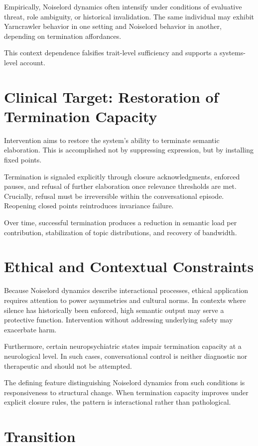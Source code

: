 \documentclass[12pt]{article}
\theoremstyle{remark}
\begin{document}
Empirically, Noiselord dynamics often intensify under conditions of evaluative threat, role ambiguity, or historical invalidation. The same individual may exhibit Yarncrawler behavior in one setting and Noiselord behavior in another, depending on termination affordances.

This context dependence falsifies trait-level sufficiency and supports a systems-level account.

\section{Clinical Target: Restoration of Termination Capacity}

Intervention aims to restore the system’s ability to terminate semantic elaboration. This is accomplished not by suppressing expression, but by installing fixed points.

Termination is signaled explicitly through closure acknowledgments, enforced pauses, and refusal of further elaboration once relevance thresholds are met. Crucially, refusal must be irreversible within the conversational episode. Reopening closed points reintroduces invariance failure.

Over time, successful termination produces a reduction in semantic load per contribution, stabilization of topic distributions, and recovery of bandwidth.

\section{Ethical and Contextual Constraints}

Because Noiselord dynamics describe interactional processes, ethical application requires attention to power asymmetries and cultural norms. In contexts where silence has historically been enforced, high semantic output may serve a protective function. Intervention without addressing underlying safety may exacerbate harm.

Furthermore, certain neuropsychiatric states impair termination capacity at a neurological level. In such cases, conversational control is neither diagnostic nor therapeutic and should not be attempted.

The defining feature distinguishing Noiselord dynamics from such conditions is responsiveness to structural change. When termination capacity improves under explicit closure rules, the pattern is interactional rather than pathological.

\section{Transition}
\end{document}
